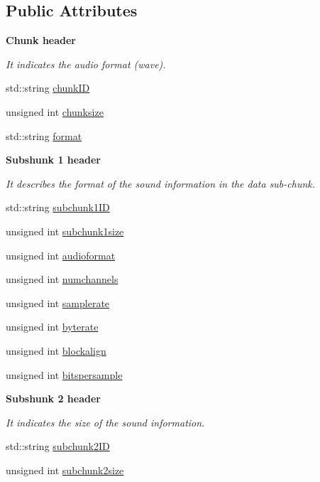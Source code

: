 \subsection*{Public Attributes}
\begin{Indent}\textbf{ Chunk header}\par
{\em It indicates the audio format (wave). }\begin{DoxyCompactItemize}
\item 
std\+::string \hyperlink{struct_w_a_v_file_1_1_header_a796a84d05ba0ddeb837804dff90b730b}{chunk\+ID}
\item 
unsigned int \hyperlink{struct_w_a_v_file_1_1_header_aee17e466b00a8b1d274be731f58d5fc0}{chunksize}
\item 
std\+::string \hyperlink{struct_w_a_v_file_1_1_header_aa3a54e23ce34d6f9cba9e9853915e30c}{format}
\end{DoxyCompactItemize}
\end{Indent}
\begin{Indent}\textbf{ Subshunk 1 header}\par
{\em It describes the format of the sound information in the data sub-\/chunk. }\begin{DoxyCompactItemize}
\item 
std\+::string \hyperlink{struct_w_a_v_file_1_1_header_ae52803bdbed54de73d48d2c0bf45099d}{subchunk1\+ID}
\item 
unsigned int \hyperlink{struct_w_a_v_file_1_1_header_ae4e68dc34f2431942bbe6a5586a3ec55}{subchunk1size}
\item 
unsigned int \hyperlink{struct_w_a_v_file_1_1_header_a6d16652e388f953230b0275301c87d2f}{audioformat}
\item 
unsigned int \hyperlink{struct_w_a_v_file_1_1_header_a1636a3deffe4e61b7ab8e8b8168a7b18}{numchannels}
\item 
unsigned int \hyperlink{struct_w_a_v_file_1_1_header_a271b0090295f7276b1d91683bc2a0f74}{samplerate}
\item 
unsigned int \hyperlink{struct_w_a_v_file_1_1_header_ac6e4c7534bfdd6e9cbd4b73079438e7f}{byterate}
\item 
unsigned int \hyperlink{struct_w_a_v_file_1_1_header_a5c212f5f08c59f8487ccc3d066753892}{blockalign}
\item 
unsigned int \hyperlink{struct_w_a_v_file_1_1_header_ad731c9ced0b22903be0b24f6528ec061}{bitspersample}
\end{DoxyCompactItemize}
\end{Indent}
\begin{Indent}\textbf{ Subshunk 2 header}\par
{\em It indicates the size of the sound information. }\begin{DoxyCompactItemize}
\item 
std\+::string \hyperlink{struct_w_a_v_file_1_1_header_a8623063c7d187207e3bca18930adacb2}{subchunk2\+ID}
\item 
unsigned int \hyperlink{struct_w_a_v_file_1_1_header_ad5ed192e56a65a330d7320769f49c5bc}{subchunk2size}
\end{DoxyCompactItemize}
\end{Indent}


